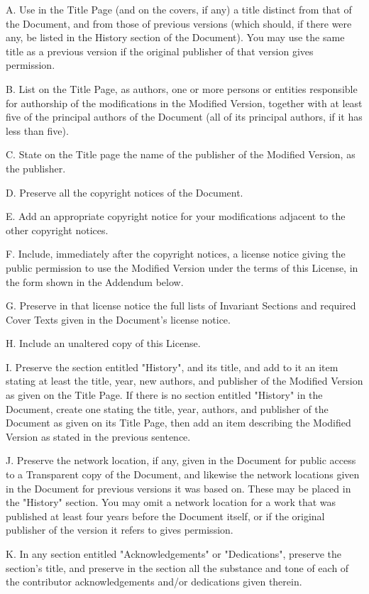 A. Use in the Title Page (and on the covers, if any) a title distinct from that of the Document, and from those of previous versions (which should, if there were any, be listed in the History section of the Document). You may use the same title as a previous version if the original publisher of that version gives permission.

B. List on the Title Page, as authors, one or more persons or entities responsible for authorship of the modifications in the Modified Version, together with at least five of the principal authors of the Document (all of its principal authors, if it has less than five).

C. State on the Title page the name of the publisher of the Modified Version, as the publisher.

D. Preserve all the copyright notices of the Document.

E. Add an appropriate copyright notice for your modifications adjacent to the other copyright notices.

F. Include, immediately after the copyright notices, a license notice giving the public permission to use the Modified Version under the terms of this License, in the form shown in the Addendum below.

G. Preserve in that license notice the full lists of Invariant Sections and required Cover Texts given in the Document's license notice.

H. Include an unaltered copy of this License.

I. Preserve the section entitled "History", and its title, and add to it an item stating at least the title, year, new authors, and publisher of the Modified Version as given on the Title Page. If there is no section entitled "History" in the Document, create one stating the title, year, authors, and publisher of the Document as given on its Title Page, then add an item describing the Modified Version as stated in the previous sentence.

J. Preserve the network location, if any, given in the Document for public access to a Transparent copy of the Document, and likewise the network locations given in the Document for previous versions it was based on. These may be placed in the "History" section. You may omit a network location for a work that was published at least four years before the Document itself, or if the original publisher of the version it refers to gives permission.

K. In any section entitled "Acknowledgements" or "Dedications", preserve the section's title, and preserve in the section all the substance and tone of each of the contributor acknowledgements and/or dedications given therein.

